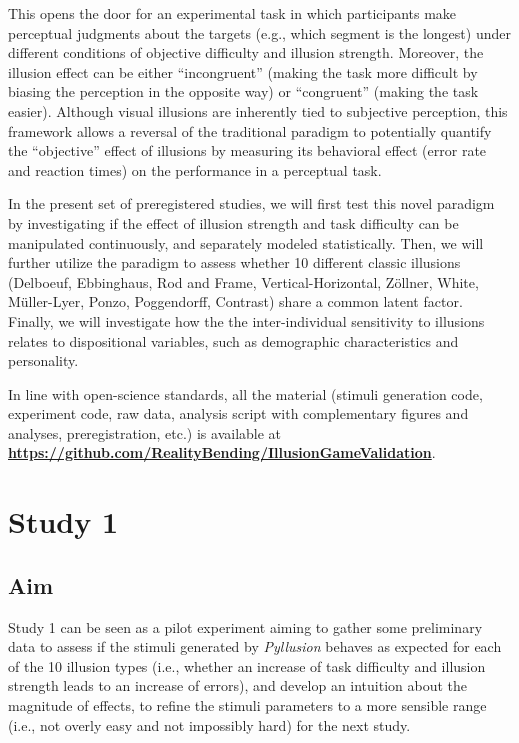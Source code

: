 \documentclass[
  man,floatsintext]{apa6}
\begin{document}
This opens the door for an experimental task in which participants make perceptual judgments about the targets (e.g., which segment is the longest) under different conditions of objective difficulty and illusion strength. Moreover, the illusion effect can be either ``incongruent'' (making the task more difficult by biasing the perception in the opposite way) or ``congruent'' (making the task easier). Although visual illusions are inherently tied to subjective perception, this framework allows a reversal of the traditional paradigm to potentially quantify the ``objective'' effect of illusions by measuring its behavioral effect (error rate and reaction times) on the performance in a perceptual task.

In the present set of preregistered studies, we will first test this novel paradigm by investigating if the effect of illusion strength and task difficulty can be manipulated continuously, and separately modeled statistically. Then, we will further utilize the paradigm to assess whether 10 different classic illusions (Delboeuf, Ebbinghaus, Rod and Frame, Vertical-Horizontal, Zöllner, White, Müller-Lyer, Ponzo, Poggendorff, Contrast) share a common latent factor. Finally, we will investigate how the the inter-individual sensitivity to illusions relates to dispositional variables, such as demographic characteristics and personality.

In line with open-science standards, all the material (stimuli generation code, experiment code, raw data, analysis script with complementary figures and analyses, preregistration, etc.) is available at \href{https://github.com/RealityBending/IllusionGameValidation}{\textbf{https://github.com/RealityBending/IllusionGameValidation}}.

\hypertarget{study-1}{%
\section{Study 1}\label{study-1}}

\hypertarget{aim}{%
\subsection{Aim}\label{aim}}

Study 1 can be seen as a pilot experiment aiming to gather some preliminary data to assess if the stimuli generated by \emph{Pyllusion} behaves as expected for each of the 10 illusion types (i.e., whether an increase of task difficulty and illusion strength leads to an increase of errors), and develop an intuition about the magnitude of effects, to refine the stimuli parameters to a more sensible range (i.e., not overly easy and not impossibly hard) for the next study.
\end{document}
